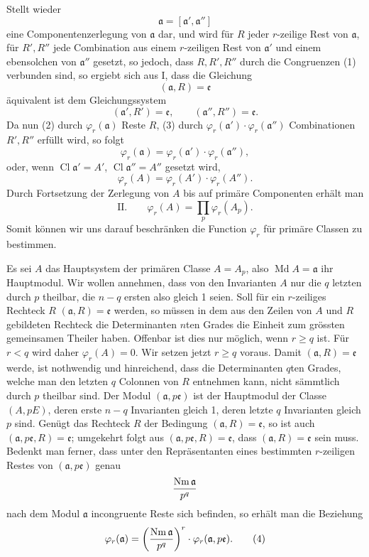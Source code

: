\documentclass[11pt,a4paper]{article}
\newcommand{\Cl}{\operatorname{Cl}}
\newcommand{\Md}{\operatorname{Md}}
\newcommand{\Nm}{\operatorname{Nm}}
\begin{document}
Stellt wieder
\[
 \mathfrak a=[\mathfrak a',\mathfrak a'']
\]
eine Componentenzerlegung von $\mathfrak a$ dar, und wird für $R$ jeder $r$-zeilige Rest von $\mathfrak a$, für $R',R''$ jede Combination aus einem $r$-zeiligen Rest von $\mathfrak a'$ und einem ebensolchen von $\mathfrak a''$ gesetzt, so jedoch, dass $R,R',R''$ durch die Congruenzen (1) verbunden sind, so ergiebt sich aus I, dass die Gleichung
\begin{equation}
 (\mathfrak a,R)=\mathfrak e
\tag{2}
\end{equation}
äquivalent ist dem Gleichungssystem
\begin{equation}
 (\mathfrak a',R')=\mathfrak e,
 \qquad
 (\mathfrak a'',R'')=\mathfrak e.
\tag{3}
\end{equation}
Da nun (2) durch $\varphi_r(\mathfrak a)$ Reste $R$, (3) durch $\varphi_r(\mathfrak a')\cdot\varphi_r(\mathfrak a'')$ Combinationen $R',R''$ erfüllt wird, so folgt
\[
 \varphi_r(\mathfrak a)=\varphi_r(\mathfrak a')\cdot\varphi_r(\mathfrak a''),
\]
oder, wenn $\Cl\mathfrak a'=A'$, $\Cl\mathfrak a''=A''$ gesetzt wird,
\[
 \varphi_r(A)=\varphi_r(A')\cdot\varphi_r(A'').
\]
Durch Fortsetzung der Zerlegung von $A$ bis auf primäre Componenten erhält man
\[
\text{II.}\qquad
 \varphi_r(A)=\prod_p \varphi_r(A_p).
\]
Somit können wir uns darauf beschränken die Function $\varphi_r$ für primäre Classen zu bestimmen.

Es sei $A$ das Hauptsystem der primären Classe $A=A_p$, also $\Md A=\mathfrak a$ ihr Hauptmodul. Wir wollen annehmen, dass von den Invarianten $A$ nur die $q$ letzten durch $p$ theilbar, die $n-q$ ersten also gleich 1 seien. Soll für ein $r$-zeiliges Rechteck $R$ $(\mathfrak a,R)=\mathfrak e$ werden, so müssen in dem aus den Zeilen von $A$ und $R$ gebildeten Rechteck die Determinanten $n$ten Grades die Einheit zum grössten gemeinsamen Theiler haben. Offenbar ist dies nur möglich, wenn $r\ge q$ ist. Für $r<q$ wird daher $\varphi_r(A)=0$. Wir setzen jetzt $r\ge q$ voraus. Damit $(\mathfrak a,R)=\mathfrak e$ werde, ist nothwendig und hinreichend, dass die Determinanten $q$ten Grades, welche man den letzten $q$ Colonnen von $R$ entnehmen kann, nicht sämmtlich durch $p$ theilbar sind. Der Modul $(\mathfrak a,p\mathfrak e)$ ist der Hauptmodul der Classe $(A,pE)$, deren erste $n-q$ Invarianten gleich 1, deren letzte $q$ Invarianten gleich $p$ sind. Genügt das Rechteck $R$ der Bedingung $(\mathfrak a,R)=\mathfrak e$, so ist auch $(\mathfrak a,p\mathfrak e,R)=\mathfrak e$; umgekehrt folgt aus $(\mathfrak a,p\mathfrak e,R)=\mathfrak e$, dass $(\mathfrak a,R)=\mathfrak e$ sein muss. Bedenkt man ferner, dass unter den Repräsentanten eines bestimmten $r$-zeiligen Restes von $(\mathfrak a,p\mathfrak e)$ genau
\[
 {\Nm\mathfrak a\over p^q}
\]
nach dem Modul $\mathfrak a$ incongruente Reste sich befinden, so erhält man die Beziehung
\begin{equation}
 \varphi_r(\mathfrak a)=\left({\Nm\mathfrak a\over p^q}\right)^r\cdot \varphi_r(\mathfrak a,p\mathfrak e).
\tag{4}
\end{equation}
\end{document}
